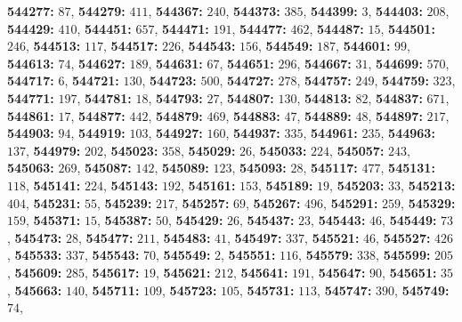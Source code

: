\textsf{\bfseries 544277:} $87$, \textsf{\bfseries 544279:} $411$, \textsf{\bfseries 544367:} $240$, \textsf{\bfseries 544373:} $385$, \textsf{\bfseries 544399:} $3$, \textsf{\bfseries 544403:} $208$, \textsf{\bfseries 544429:} $410$, \textsf{\bfseries 544451:} $657$, \textsf{\bfseries 544471:} $191$, \textsf{\bfseries 544477:} $462$, \textsf{\bfseries 544487:} $15$, \textsf{\bfseries 544501:} $246$, \textsf{\bfseries 544513:} $117$, \textsf{\bfseries 544517:} $226$, \textsf{\bfseries 544543:} $156$, \textsf{\bfseries 544549:} $187$, \textsf{\bfseries 544601:} $99$, \textsf{\bfseries 544613:} $74$, \textsf{\bfseries 544627:} $189$, \textsf{\bfseries 544631:} $67$, \textsf{\bfseries 544651:} $296$, \textsf{\bfseries 544667:} $31$, \textsf{\bfseries 544699:} $570$, \textsf{\bfseries 544717:} $6$, \textsf{\bfseries 544721:} $130$, \textsf{\bfseries 544723:} $500$, \textsf{\bfseries 544727:} $278$, \textsf{\bfseries 544757:} $249$, \textsf{\bfseries 544759:} $323$, \textsf{\bfseries 544771:} $197$, \textsf{\bfseries 544781:} $18$, \textsf{\bfseries 544793:} $27$, \textsf{\bfseries 544807:} $130$, \textsf{\bfseries 544813:} $82$, \textsf{\bfseries 544837:} $671$, \textsf{\bfseries 544861:} $17$, \textsf{\bfseries 544877:} $442$, \textsf{\bfseries 544879:} $469$, \textsf{\bfseries 544883:} $47$, \textsf{\bfseries 544889:} $48$, \textsf{\bfseries 544897:} $217$, \textsf{\bfseries 544903:} $94$, \textsf{\bfseries 544919:} $103$, \textsf{\bfseries 544927:} $160$, \textsf{\bfseries 544937:} $335$, \textsf{\bfseries 544961:} $235$, \textsf{\bfseries 544963:} $137$, \textsf{\bfseries 544979:} $202$, \textsf{\bfseries 545023:} $358$, \textsf{\bfseries 545029:} $26$, \textsf{\bfseries 545033:} $224$, \textsf{\bfseries 545057:} $243$, \textsf{\bfseries 545063:} $269$, \textsf{\bfseries 545087:} $142$, \textsf{\bfseries 545089:} $123$, \textsf{\bfseries 545093:} $28$, \textsf{\bfseries 545117:} $477$, \textsf{\bfseries 545131:} $118$, \textsf{\bfseries 545141:} $224$, \textsf{\bfseries 545143:} $192$, \textsf{\bfseries 545161:} $153$, \textsf{\bfseries 545189:} $19$, \textsf{\bfseries 545203:} $33$, \textsf{\bfseries 545213:} $404$, \textsf{\bfseries 545231:} $55$, \textsf{\bfseries 545239:} $217$, \textsf{\bfseries 545257:} $69$, \textsf{\bfseries 545267:} $496$, \textsf{\bfseries 545291:} $259$, \textsf{\bfseries 545329:} $159$, \textsf{\bfseries 545371:} $15$, \textsf{\bfseries 545387:} $50$, \textsf{\bfseries 545429:} $26$, \textsf{\bfseries 545437:} $23$, \textsf{\bfseries 545443:} $46$, \textsf{\bfseries 545449:} $73$, \textsf{\bfseries 545473:} $28$, \textsf{\bfseries 545477:} $211$, \textsf{\bfseries 545483:} $41$, \textsf{\bfseries 545497:} $337$, \textsf{\bfseries 545521:} $46$, \textsf{\bfseries 545527:} $426$, \textsf{\bfseries 545533:} $337$, \textsf{\bfseries 545543:} $70$, \textsf{\bfseries 545549:} $2$, \textsf{\bfseries 545551:} $116$, \textsf{\bfseries 545579:} $338$, \textsf{\bfseries 545599:} $205$, \textsf{\bfseries 545609:} $285$, \textsf{\bfseries 545617:} $19$, \textsf{\bfseries 545621:} $212$, \textsf{\bfseries 545641:} $191$, \textsf{\bfseries 545647:} $90$, \textsf{\bfseries 545651:} $35$, \textsf{\bfseries 545663:} $140$, \textsf{\bfseries 545711:} $109$, \textsf{\bfseries 545723:} $105$, \textsf{\bfseries 545731:} $113$, \textsf{\bfseries 545747:} $390$, \textsf{\bfseries 545749:} $74$, 
